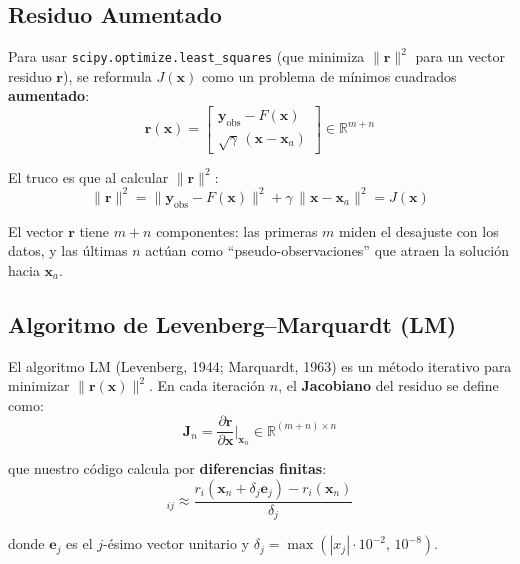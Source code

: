 \documentclass[a4paper,11pt]{article}
\begin{document}
\subsection{Residuo Aumentado}

Para usar \texttt{scipy.optimize.least\_squares} (que minimiza
$\|\mathbf{r}\|^2$ para un vector residuo $\mathbf{r}$), se reformula
$J(\mathbf{x})$ como un problema de m\'inimos cuadrados \textbf{aumentado}:
\begin{equation}\label{eq:augmented_residual}
    \mathbf{r}(\mathbf{x}) = \begin{bmatrix}
        \mathbf{y}_{\text{obs}} - F(\mathbf{x}) \\[4pt]
        \sqrt{\gamma}\,(\mathbf{x} - \mathbf{x}_a)
    \end{bmatrix}
    \in \mathbb{R}^{m+n}
\end{equation}

El truco es que al calcular $\|\mathbf{r}\|^2$:
\begin{equation}
    \|\mathbf{r}\|^2 = \|\mathbf{y}_{\text{obs}} - F(\mathbf{x})\|^2
    + \gamma\,\|\mathbf{x} - \mathbf{x}_a\|^2 = J(\mathbf{x})
\end{equation}

El vector $\mathbf{r}$ tiene $m+n$ componentes: las primeras $m$ miden el
desajuste con los datos, y las \'ultimas $n$ act\'uan como
``pseudo-observaciones'' que atraen la soluci\'on hacia $\mathbf{x}_a$.

\subsection{Algoritmo de Levenberg--Marquardt (LM)}

El algoritmo LM (Levenberg, 1944; Marquardt, 1963) es un m\'etodo iterativo
para minimizar $\|\mathbf{r}(\mathbf{x})\|^2$.  En cada iteraci\'on $n$,
el \textbf{Jacobiano} del residuo se define como:
\begin{equation}
    \mathbf{J}_n = \frac{\partial\mathbf{r}}{\partial\mathbf{x}}\bigg|_{\mathbf{x}_n}
    \in \mathbb{R}^{(m+n)\times n}
\end{equation}

que nuestro c\'odigo calcula por \textbf{diferencias finitas}:
\begin{equation}
    [\mathbf{J}_n]_{ij} \approx \frac{r_i(\mathbf{x}_n + \delta_j\mathbf{e}_j) - r_i(\mathbf{x}_n)}{\delta_j}
\end{equation}

donde $\mathbf{e}_j$ es el $j$-\'esimo vector unitario y
$\delta_j = \max(|x_j| \cdot 10^{-2},\, 10^{-8})$.
\end{document}
